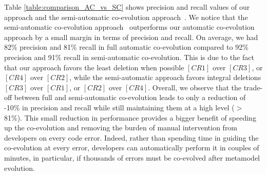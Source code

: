 	Table \ref{table:comparison_AC_vs_SC} shows precision and recall values of our approach and the semi-automatic co-evolution approach~\cite{Khelladi2020}. 
	We notice that the semi-automatic co-evolution approach~\cite{Khelladi2020} outperforms our automatic co-evolution approach by a small margin in terms of precision and recall. %
	On average, we had 82\% precision and 81\% recall in full automatic co-evolution compared to 92\% precision and 91\% recall in semi-automatic co-evolution. 
	This is due to the fact that our approach favors the least deletion when possible $[CR1]$ over $[CR3]$, or $[CR4]$ over $[CR2]$, while the semi-automatic approach favors integral deletions $[CR3]$ over $[CR1]$, or $[CR2]$ over $[CR4]$. %
	Overall, we observe that the trade-off between full and semi-automatic co-evolution leads to only a reduction of -10\% in precision and recall while still maintaining them at a high level ($>$ 81\%). This small reduction in performance provides a bigger benefit of speeding up the co-evolution and removing the burden of manual intervention from developers on every code error. Indeed, rather than spending time in guiding the co-evolution at every error, developers can automatically perform it in couples of minutes, in particular, if thousands of errors must be co-evolved after metamodel evolution.
	
